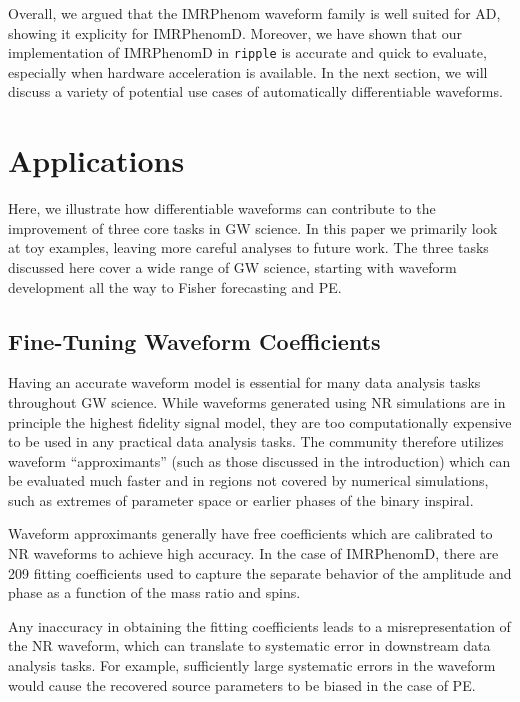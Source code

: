 \documentclass[twocolumn]{aastex631}
\newcommand{\ripple}{\texttt{ripple}\xspace}
\begin{document}
Overall, we argued that the IMRPhenom waveform family is well suited for AD, showing it explicity for IMRPhenomD.
Moreover, we have shown that our implementation of IMRPhenomD in \ripple is accurate and quick to evaluate, especially when hardware acceleration is available.
In the next section, we will discuss a variety of potential use cases of automatically differentiable waveforms.

\section{Applications}
\label{sec:applications}

Here, we illustrate how differentiable waveforms can contribute to the improvement of three core tasks in GW science.
In this paper we primarily look at toy examples, leaving more careful analyses to future work. 
The three tasks discussed here cover a wide range of GW science, starting with waveform development all the way to Fisher forecasting and PE.

\subsection{Fine-Tuning Waveform Coefficients}
\label{subsec:coeffs}

Having an accurate waveform model is essential for many data analysis tasks throughout
GW science.
While waveforms generated using NR simulations are in principle the highest fidelity signal model, they are too computationally expensive to be used in any practical data analysis tasks.
The community therefore utilizes waveform ``approximants'' (such as those discussed in the introduction) which can be evaluated much faster and in regions not covered by numerical simulations, such as extremes of parameter space or earlier phases of the binary inspiral.

Waveform approximants generally have free coefficients which are calibrated
to NR waveforms to achieve high accuracy.
In the case of IMRPhenomD, there are 209 fitting coefficients used to capture the separate behavior of the amplitude and phase as a function of the mass ratio and spins.

Any inaccuracy in obtaining the fitting coefficients
leads to a misrepresentation of the NR waveform, which can translate to systematic
error in downstream data analysis tasks. For example, sufficiently large
systematic errors in the waveform would cause the recovered source parameters to be biased
in the case of PE.
\end{document}
